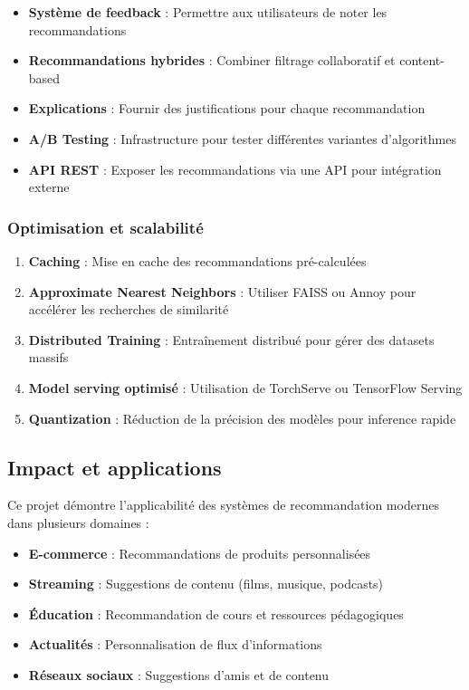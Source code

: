 \documentclass[12pt,a4paper]{article}
\begin{document}
\begin{itemize}
    \item \textbf{Système de feedback} : Permettre aux utilisateurs de noter les recommandations
    \item \textbf{Recommandations hybrides} : Combiner filtrage collaboratif et content-based
    \item \textbf{Explications} : Fournir des justifications pour chaque recommandation
    \item \textbf{A/B Testing} : Infrastructure pour tester différentes variantes d'algorithmes
    \item \textbf{API REST} : Exposer les recommandations via une API pour intégration externe
\end{itemize}

\subsubsection{Optimisation et scalabilité}

\begin{enumerate}
    \item \textbf{Caching} : Mise en cache des recommandations pré-calculées
    \item \textbf{Approximate Nearest Neighbors} : Utiliser FAISS ou Annoy pour accélérer les recherches de similarité
    \item \textbf{Distributed Training} : Entraînement distribué pour gérer des datasets massifs
    \item \textbf{Model serving optimisé} : Utilisation de TorchServe ou TensorFlow Serving
    \item \textbf{Quantization} : Réduction de la précision des modèles pour inference rapide
\end{enumerate}

\subsection{Impact et applications}

Ce projet démontre l'applicabilité des systèmes de recommandation modernes dans plusieurs domaines :

\begin{itemize}
    \item \textbf{E-commerce} : Recommandations de produits personnalisées
    \item \textbf{Streaming} : Suggestions de contenu (films, musique, podcasts)
    \item \textbf{Éducation} : Recommandation de cours et ressources pédagogiques
    \item \textbf{Actualités} : Personnalisation de flux d'informations
    \item \textbf{Réseaux sociaux} : Suggestions d'amis et de contenu
\end{itemize}
\end{document}
